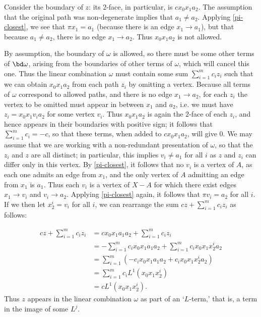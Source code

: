 Consider the boundary of $z$: its $2$-face, in particular, is $c x_0 x_1 a_2$. The assumption that the original path was non-degenerate implies that $a_1 \neq a_2$. Applying \cref{pi-closest}, we see that $\pi x_1 = a_1$ (because there is an edge $x_1 \to a_1$), but that because $a_1 \neq a_2$, there is no edge $x_1 \to a_2$. Thus $x_0 x_1 a_2$ is not allowed. 

By assumption, the boundary of $\omega$ is allowed, so there must be some other terms of $\bd \omega$, arising from the boundaries of other terms of $\omega$, which will cancel this one. Thus the linear combination $\omega$ must contain some sum $\sum_{i=1}^m c_i z_i$ such that we can obtain $x_0 x_1 a_2$ from each path $z_i$ by omitting a vertex. Because all terms of $\omega$ correspond to allowed paths, and there is no edge $x_1 \to a_2$, for each $z_i$ the vertex to be omitted must appear in between $x_1$ and $a_2$, i.e.  we must have $z_i = x_0 x_1 v_i a_2$ for some vertex $v_i$. Thus $x_0 x_1 a_2$ is again the $2$-face of each $z_i$, and hence appears in their boundaries with positive sign; it follows that $\sum_{i = 1}^m c_i = -c$, so that these terms, when added to $c x_0 x_1 a_2$, will give $0$. We may assume that we are working with a non-redundant presentation of $\omega$, so that the $z_i$ and $z$ are all distinct; in particular, this implies $v_i \neq a_1$ for all $i$ as $z$ and $z_i$ can differ only in this vertex. By \cref{pi-closest}, it follows that no $v_i$ is a vertex of $A$, as each one admits an edge from $x_1$, and the only vertex of $A$ admitting an edge from $x_1$ is $a_1$. Thus each $v_i$ is a vertex of $X - A$ for which there exist edges $x_1 \to v_i$ and $v_i \to a_2$. Applying \cref{pi-closest} again, it follows that $\pi v_i = a_2$ for all $i$.
If we then let $x^i_2 = v_i$ for all $i$, we can rearrange the sum $c z + \sum_{i=1}^m c_i z_i$ as follows:


\begin{align*}
c z + \sum_{i=1}^m c_i z_i & = cx_0 x_1 a_1 a_2 + \sum_{i=1}^m c_i z_i \\
& = - \sum_{i=1}^m c_i x_0 x_1 a_1 a_2 + \sum_{i=1}^m c_i x_0 x_1 x_2^i a_2 \\
& = \sum_{i=1}^m(- c_i x_0 x_1 a_1 a_2 + c_i x_0 x_1 x_2^i a_2) \\
& = \sum_{i=1}^m c_i L^1(x_0 x_1 x_2^i) \\
& = c L^1(x_0 x_1 x_2^i).
\end{align*}
Thus $z$ appears in the linear combination $\omega$ as part of an `$L$-term,' that is, a term in the image of some $L^j$. 

